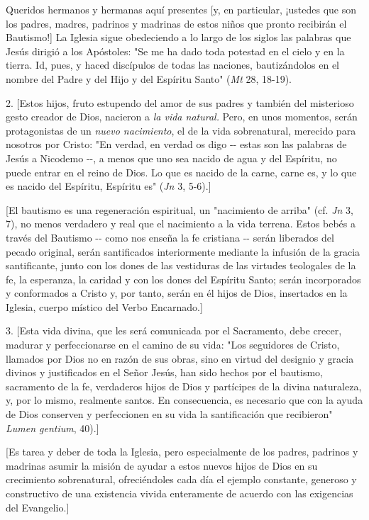 \begin{body}
Queridos hermanos y hermanas aquí presentes {[}y, en particular, ¡ustedes que son los padres, madres, padrinos y madrinas de estos niños que pronto recibirán el Bautismo!{]} La Iglesia sigue obedeciendo a lo largo de los siglos las palabras que Jesús dirigió a los Apóstoles: "Se me ha dado toda potestad en el cielo y en la tierra. Id, pues, y haced discípulos de todas las naciones, bautizándolos en el nombre del Padre y del Hijo y del Espíritu Santo" (\emph{Mt} 28, 18-19).

2. {[}Estos hijos, fruto estupendo del amor de sus padres y también del misterioso gesto creador de Dios, nacieron a \emph{la vida natural.} Pero, en unos momentos, serán protagonistas de un \emph{nuevo nacimiento}, el de la vida sobrenatural, merecido para nosotros por Cristo: "En verdad, en verdad os digo -\/- estas son las palabras de Jesús a Nicodemo -\/-, a menos que uno sea nacido de agua y del Espíritu, no puede entrar en el reino de Dios. Lo que es nacido de la carne, carne es, y lo que es nacido del Espíritu, Espíritu es" (\emph{Jn} 3, 5-6).{]}

{[}El bautismo es una regeneración espiritual, un "nacimiento de arriba" (cf. \emph{Jn} 3, 7), no menos verdadero y real que el nacimiento a la vida terrena. Estos bebés a través del Bautismo -\/- como nos enseña la fe cristiana -\/- serán liberados del pecado original, serán santificados interiormente mediante la infusión de la gracia santificante, junto con los dones de las vestiduras de las virtudes teologales de la fe, la esperanza, la caridad y con los dones del Espíritu Santo; serán incorporados y conformados a Cristo y, por tanto, serán en él hijos de Dios, insertados en la Iglesia, cuerpo místico del Verbo Encarnado.{]}

3. {[}Esta vida divina, que les será comunicada por el Sacramento, debe crecer, madurar y perfeccionarse en el camino de su vida: "Los seguidores de Cristo, llamados por Dios no en razón de sus obras, sino en virtud del designio y gracia divinos y justificados en el Señor Jesús, han sido hechos por el bautismo, sacramento de la fe, verdaderos hijos de Dios y partícipes de la divina naturaleza, y, por lo mismo, realmente santos. En consecuencia, es necesario que con la ayuda de Dios conserven y perfeccionen en su vida la santificación que recibieron" \emph{Lumen gentium}, 40).{]}

{[}Es tarea y deber de toda la Iglesia, pero especialmente de los padres, padrinos y madrinas asumir la misión de ayudar a estos nuevos hijos de Dios en su crecimiento sobrenatural, ofreciéndoles cada día el ejemplo constante, generoso y constructivo de una existencia vivida enteramente de acuerdo con las exigencias del Evangelio.{]}


\end{body}
